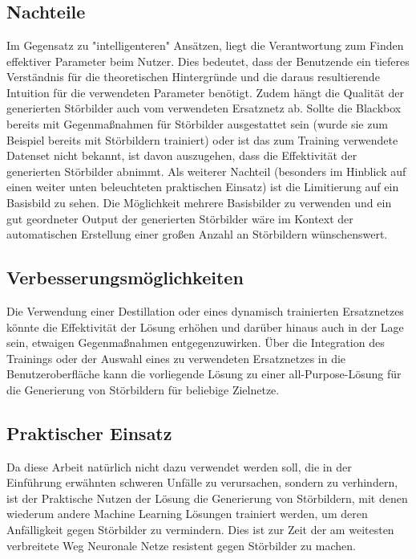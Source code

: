 \chapter{}
\label{cha:conclusion}

\section{Nachteile}

Im Gegensatz zu "intelligenteren" Ansätzen, liegt die Verantwortung zum Finden effektiver Parameter beim Nutzer. Dies bedeutet, dass der Benutzende ein tieferes Verständnis für die theoretischen Hintergründe und die daraus resultierende Intuition für die verwendeten Parameter benötigt. 
Zudem hängt die Qualität der generierten Störbilder auch vom verwendeten Ersatznetz ab. Sollte die Blackbox bereits mit Gegenmaßnahmen für Störbilder ausgestattet sein (wurde sie zum Beispiel bereits mit Störbildern trainiert) oder ist das zum Training verwendete Datenset nicht bekannt, ist davon auszugehen, dass die Effektivität der generierten Störbilder abnimmt.
Als weiterer Nachteil (besonders im Hinblick auf einen weiter unten beleuchteten praktischen Einsatz) ist die Limitierung auf ein Basisbild zu sehen. Die Möglichkeit mehrere Basisbilder zu verwenden und ein gut geordneter Output der generierten Störbilder wäre im Kontext der automatischen Erstellung einer großen Anzahl an Störbildern wünschenswert. 

\section{Verbesserungsmöglichkeiten}

Die Verwendung einer Destillation oder eines dynamisch trainierten Ersatznetzes könnte die Effektivität der Lösung erhöhen und darüber hinaus auch in der Lage sein, etwaigen Gegenmaßnahmen entgegenzuwirken.
Über die Integration des Trainings oder der Auswahl eines zu verwendeten Ersatznetzes in die Benutzeroberfläche kann die vorliegende Lösung zu einer all-Purpose-Lösung für die Generierung von Störbildern für beliebige Zielnetze.

\section{Praktischer Einsatz} 

Da diese Arbeit natürlich nicht dazu verwendet werden soll, die in der Einführung erwähnten schweren Unfälle zu verursachen, sondern zu verhindern, ist der Praktische Nutzen der Lösung die Generierung von Störbildern, mit denen wiederum andere Machine Learning Lösungen trainiert werden, um deren Anfälligkeit gegen Störbilder zu vermindern. Dies ist zur Zeit der am weitesten verbreitete Weg Neuronale Netze resistent gegen Störbilder zu machen.  